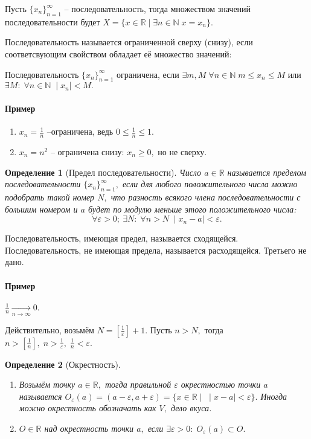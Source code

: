 \documentclass{article}
\newtheorem{Definition}{Определение}[section]
\begin{document}
Пусть $\{x_n\}_{n=1}^{\infty}$ -- последовательность, тогда множеством значений последовательности будет $X=\{x\in\mathbb{R}\mid\exists n\in\mathbb{N} \; x=x_n\}.$

Последовательность называется ограниченной сверху (снизу), если соответсвующим свойством обладает её множество значений: 

Последовательность $\{x_n\}_{n=1}^{\infty}$ ограничена, если $\exists m, M \; \forall n\in\mathbb{N} \; m\leq x_n\leq M$ или $\exists M: \; \forall n\in\mathbb{N} \; \mid x_n\mid<M.$

\paragraph{Пример}
\begin{enumerate}
\item $x_n=\frac{1}{n}$ --ограничена, ведь $0\leq\frac{1}{n}\leq1.$
\item $x_n=n^2$ -- ограничена снизу: $x_n\geq 0,$ но не сверху.
\end{enumerate}

\begin{Definition}[Предел последовательности]
Число $a\in\mathbb{R}$ называется пределом последовательности $\{x_n\}_{n=1}^{\infty},$ если для любого положительного числа можно подобрать такой номер $N,$ что разность всякого члена последовательности с большим номером и $a$ будет по модулю меньше этого положительного числа: $$\forall \varepsilon>0 ;\ \exists N: \; \forall n>N \; \mid x_n-a\mid<\varepsilon.$$
\end{Definition}

Последовательность, имеющая предел, называется сходящейся.
Последовательность, не имеющая предела, называется расходящейся.
Третьего не дано.

\paragraph{Пример}
$\frac{1}{n} \xrightarrow[n\rightarrow \infty]{} 0.$

Действительно, возьмём $N=\left[\frac{1}{\varepsilon}\right] +1.$ Пусть $n>N,$ тогда $n>\left[\frac{1}{n}\right], \; n>\frac{1}{\varepsilon}, \; \frac{1}{n}<\varepsilon.$

\begin{Definition}[Окрестность]
\begin{enumerate}
\item Возьмём точку $a\in\mathbb{R},$ тогда правильной $\varepsilon$ окрестностью точки $a$ называется $O_{\varepsilon}(a)=(a-\varepsilon, a+\varepsilon) = \{x\in\mathbb{R}\mid \; \mid x-a\mid<\varepsilon\}.$ Иногда можно окрестность обозначать как $V,$ дело вкуса.
\item $O\in\mathbb{R}$ над окрестность точки $a,$ если $\exists\varepsilon>0: \; O_{\varepsilon}(a)\subset O.$
\end{enumerate}
\end{Definition}
\end{document}
